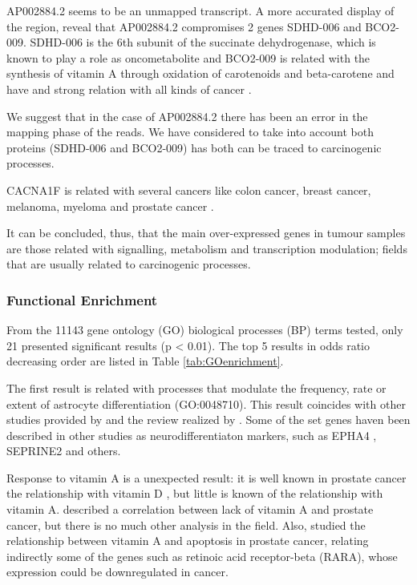 \documentclass[9pt,twocolumn,twoside]{gsajnl}
\begin{document}
AP002884.2 seems to be an unmapped transcript. A more accurated display of the region, reveal that AP002884.2 compromises 2 genes SDHD-006 and BCO2-009. SDHD-006 is the 6th subunit of the succinate dehydrogenase, which is known to play a role as oncometabolite \cite{oncometabolites} and BCO2-009 is related with the synthesis of vitamin A through oxidation of carotenoids  and beta-carotene and have and strong relation with all kinds of cancer \cite{proteinatlas,uhlen2015tissue}.

We suggest that in the case of AP002884.2 there has been an error in the mapping phase of the reads. We have considered to take into account both proteins (SDHD-006 and BCO2-009) has both can be traced to carcinogenic processes.

CACNA1F is related with several cancers like colon cancer, breast cancer, melanoma, myeloma and prostate cancer \citep{tcng}.


It can be concluded, thus, that the main over-expressed genes in tumour samples are those related with signalling, metabolism and transcription modulation; fields that are usually related to carcinogenic processes.

\subsubsection*{Functional Enrichment}

From the 11143 gene ontology (GO) biological processes (BP) terms tested, only 21 presented significant results (p < 0.01). The top 5 results in odds ratio decreasing order are listed in Table \ref{tab:GOenrichment}.

The first result is related with processes that modulate the frequency, rate or extent of astrocyte differentiation (GO:0048710). This result coincides with other studies provided by \cite{neuroendocrine3, neuroendocrine2} and the review realized by \cite{neuroendocrine1}. Some of the set genes haven been described in other studies as neurodifferentiaton markers, such as EPHA4 \cite{neuroendocrine_EPA}, SEPRINE2 \cite{mckee2013protease} and others.

Response to vitamin A is a unexpected result: it is well known in prostate cancer the relationship with vitamin D \citep{vitamin0,vitamind1,vitamind2,vitamind3}, but little is known of the relationship with vitamin A. \cite{vitamina1} described a correlation between lack of vitamin A and prostate cancer, but there is no much other analysis in the field. Also, \cite{vitamina2} studied the relationship between vitamin A and apoptosis in prostate cancer, relating indirectly some of the genes such as retinoic acid receptor-beta (RARA), whose expression could be downregulated in cancer.
\end{document}
